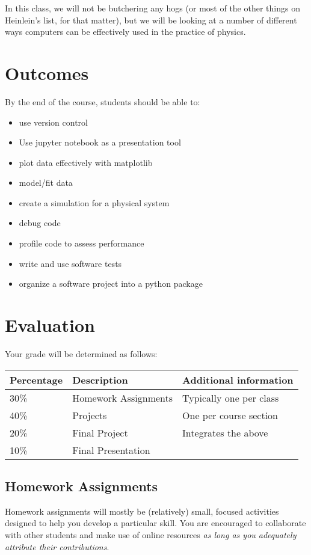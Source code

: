 \documentclass{tufte-handout}
\begin{document}
In this class, we will not be butchering any hogs (or most of the other things on Heinlein's list, for that matter), but we will be looking at a number of different ways computers can be effectively used in the practice of physics.

\section{Outcomes}
\label{sec-3}
By the end of the course, students should be able to:
\begin{itemize}
\item use version control
\item Use jupyter notebook as a presentation tool
\item plot data effectively with matplotlib
\item model/fit data
\item create a simulation for a physical system
\item debug code
\item profile code to assess performance
\item write and use software tests
\item organize a software project into a python package
\end{itemize}

\section{Evaluation}
\label{sec-4}
Your grade will be determined as follows:

\begin{center}
\begin{tabular}{lll}
Percentage & Description & Additional information\\
\hline
30\% & Homework Assignments & Typically one per class\\
40\% & Projects & One per course section\\
20\% & Final Project & Integrates the above\\
10\% & Final Presentation & \\
\end{tabular}
\end{center}

\subsection{Homework Assignments}
\label{sec-4-1}
Homework assignments will mostly be (relatively) small, focused activities designed to help you develop a particular skill. You are encouraged to collaborate with other students and make use of online resources \emph{as long as you adequately attribute their contributions}.
\end{document}
